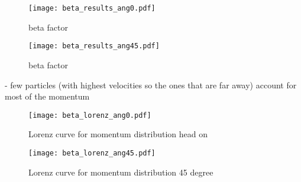 \begin{figure}[H]
   \centering
   \texttt{[image: beta\_results\_ang0.pdf]}
   \caption{beta factor}
   \label{fig:beta_factor_0}
\end{figure}

\begin{figure}[H]
   \centering
   \texttt{[image: beta\_results\_ang45.pdf]}
   \caption{beta factor}
   \label{fig:beta_factor_45}
\end{figure}


- few particles (with highest velocities so the ones that are far away) account for most of the momentum

\begin{figure}[H]
   \centering
   \texttt{[image: beta\_lorenz\_ang0.pdf]}
   \caption{Lorenz curve for momentum distribution head on}
   \label{fig:beta_factor_lorenz_0}
\end{figure}

\begin{figure}[H]
   \centering
   \texttt{[image: beta\_lorenz\_ang45.pdf]}
   \caption{Lorenz curve for momentum distribution 45 degree}
   \label{fig:beta_factor_lorenz_45}
\end{figure}